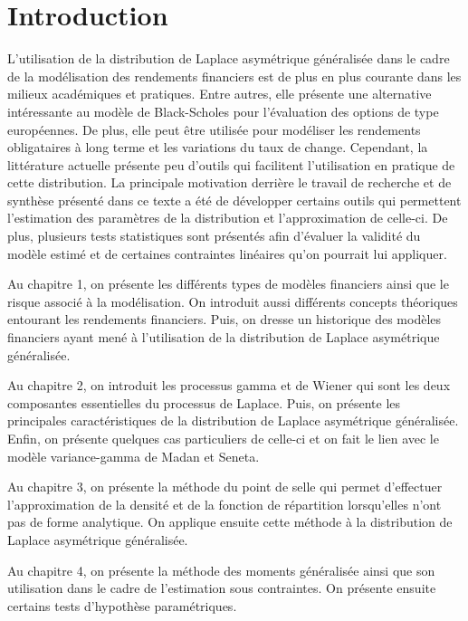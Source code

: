 \chapter*{Introduction}

L'utilisation de la distribution de Laplace asymétrique généralisée
dans le cadre de la modélisation des rendements financiers est de plus
en plus courante dans les milieux académiques et pratiques. Entre
autres, elle présente une alternative intéressante au modèle de
Black-Scholes pour l'évaluation des options de type européennes. De
plus, elle peut être utilisée pour modéliser les rendements
obligataires à long terme et les variations du taux de
change. Cependant, la littérature actuelle présente peu d'outils qui
facilitent l'utilisation en pratique de cette distribution. La
principale motivation derrière le travail de recherche et de synthèse
présenté dans ce texte a été de développer certains outils qui
permettent l'estimation des paramètres de la distribution et
l'approximation de celle-ci. De plus, plusieurs tests statistiques
sont présentés afin d'évaluer la validité du modèle estimé et de
certaines contraintes linéaires qu'on pourrait lui appliquer.

Au chapitre 1, on présente les différents types de modèles financiers
ainsi que le risque associé à la modélisation. On introduit aussi
différents concepts théoriques entourant les rendements
financiers. Puis, on dresse un historique des modèles financiers ayant
mené à l'utilisation de la distribution de Laplace asymétrique
généralisée.

Au chapitre 2, on introduit les processus gamma et de Wiener qui sont
les deux composantes essentielles du processus de Laplace. Puis, on
présente les principales caractéristiques de la distribution de
Laplace asymétrique généralisée. Enfin, on présente quelques cas
particuliers de celle-ci et on fait le lien avec le modèle
variance-gamma de Madan et Seneta.

Au chapitre 3, on présente la méthode du point de selle qui permet
d'effectuer l'approximation de la densité et de la fonction de
répartition lorsqu'elles n'ont pas de forme analytique. On applique
ensuite cette méthode à la distribution de Laplace asymétrique
généralisée.

Au chapitre 4, on présente la méthode des moments généralisée ainsi
que son utilisation dans le cadre de l'estimation sous contraintes. On
présente ensuite certains tests d'hypothèse paramétriques.

